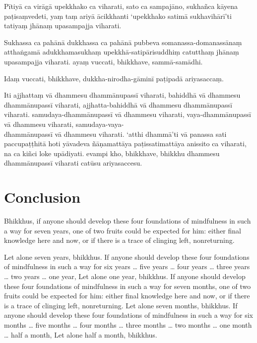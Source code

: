 Pītiyā ca virāgā upekkhako ca viharati, sato ca sampajāno, sukhañca kāyena
paṭisaṃvedeti, yaṃ taṃ ariyā ācikkhanti ‘upekkhako satimā sukhavihārī’ti tatiyaṃ
jhānaṃ upasampajja viharati.

Sukhassa ca pahānā dukkhassa ca pahānā pubbeva somanassa-domanassānaṃ atthaṅgamā
adukkhamasukhaṃ upekkhā-satipārisuddhiṃ catutthaṃ jhānaṃ upasampajja viharati.
ayaṃ vuccati, bhikkhave, sammā-samādhi.

Idaṃ vuccati, bhikkhave, dukkha-nirodha-gāminī paṭipadā ariyasaccaṃ.

Iti ajjhattaṃ vā dhammesu dhammānupassī viharati,
bahiddhā vā dhammesu dhammānupassī viharati,
ajjhatta-bahiddhā vā dhammesu dhammānupassī viharati.
samudaya-dhammānupassī vā dhammesu viharati,
vaya-dhammānupassī vā dhammesu viharati,
samudaya-vaya-\\ dhammānupassī vā dhammesu viharati.
‘atthi dhammā’ti vā panassa sati paccupaṭṭhitā hoti
yāvadeva ñāṇamattāya paṭissatimattāya anissito ca viharati,
na ca kiñci loke upādiyati. evampi kho, bhikkhave, bhikkhu
dhammesu dhammānupassī viharati catūsu ariyasaccesu.



\englishPage
\chapter{Conclusion}

Bhikkhus, if anyone should develop these four foundations of mindfulness in
such a way for seven years, one of two fruits could be expected for him: either
final knowledge here and now, or if there is a trace of clinging left,
nonreturning.

Let alone seven years, bhikkhus. If anyone should develop these four
foundations of mindfulness in such a way for six years \ldots{} five years
\ldots{} four years \ldots{} three years \ldots{} two years \ldots{} one year,
Let alone one year, bhikkhus. If anyone should develop these four foundations
of mindfulness in such a way for seven months, one of two fruits could be
expected for him: either final knowledge here and now, or if there is a trace of
clinging left, nonreturning. Let alone seven months, bhikkhus. If anyone should
develop these four foundations of mindfulness in such a way for six months
\ldots{} five months \ldots{} four months \ldots{} three months \ldots{} two
months \ldots{} one month \ldots{} half a month, Let alone half a month,
bhikkhus.

